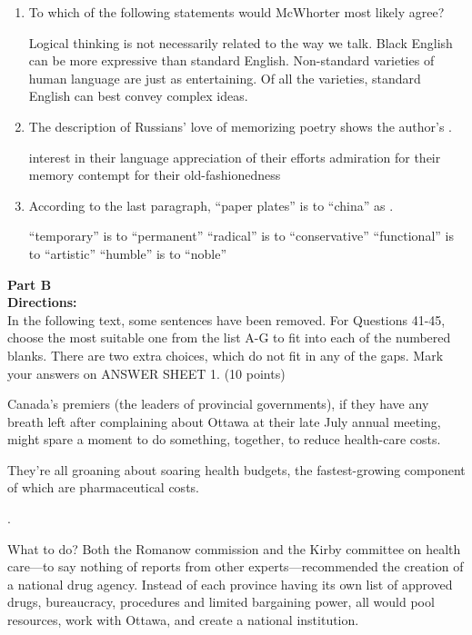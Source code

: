 {\begin{enumerate}[resume]
\fourchoices
{modesty}
{personality}
{liveliness}
{informality}



\item
To which of the following statements would McWhorter most
likely agree?

\fourchoices
{Logical thinking is not necessarily related to the way we talk.}
{Black English can be more expressive than standard English.}
{Non-standard varieties of human language are just as entertaining.}
{Of all the varieties, standard English can best convey complex ideas.}



\item
The description of Russians' love of memorizing poetry shows
the author's \lineread.


\fourchoices
{interest in their language}
{appreciation of their efforts}
{admiration for their memory}
{contempt for their old-fashionedness}


\item
 According to the last paragraph, ``paper plates'' is to
``china'' as \lineread.


\fourchoices
{``temporary'' is to ``permanent''}
{``radical'' is to ``conservative''}
{``functional'' is to ``artistic''}
{``humble'' is to ``noble''}
	
\end{enumerate}



\newpage
\noindent
\textbf{Part B}\\
\textbf{Directions:}\\
In the following text, some sentences have been removed. For
	Questions 41-45, choose the most suitable one from the list A-G to fit
	into each of the numbered blanks. There are two extra choices, which do
	not fit in any of the gaps. Mark your answers on ANSWER SHEET 1. (10
	points)
	
\TiGanSpace

Canada's premiers (the leaders of provincial governments), if they have
any breath left after complaining about Ottawa at their late July annual
meeting, might spare a moment to do something, together, to reduce
health-care costs.

They're all groaning about soaring health budgets, the fastest-growing
component of which are pharmaceutical costs.

\linefill.

What to do? Both the Romanow commission and the Kirby committee on
health care---to say nothing of reports from other experts---recommended
the creation of a national drug agency. Instead of each province having
its own list of approved drugs, bureaucracy, procedures and limited
bargaining power, all would pool resources, work with Ottawa, and create
a national institution.

}

